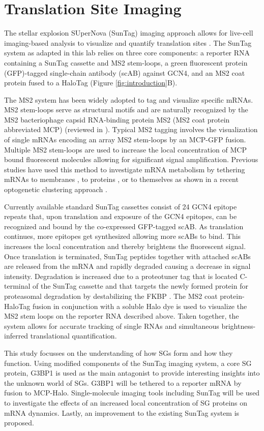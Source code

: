     
\section{Translation Site Imaging} \label{translation_site_imaging}

The stellar explosion SUperNova (SunTag) imaging approach allows for live-cell imaging-based analysis to visualize and quantify translation sites \cite{tanenbaum_protein-tagging_2014}.
The SunTag system as adapted in this lab relies on three core components: a reporter RNA containing a SunTag cassette and MS2 stem-loops, a green fluorescent protein (GFP)-tagged single-chain antibody (scAB) against GCN4, and an MS2 coat protein fused to a HaloTag (Figure \ref{fig:introduction}B).

The MS2 system has been widely adopted to tag and visualize specific mRNAs.
MS2 stem-loops serve as structural motifs and are naturally recognized by the MS2 bacteriophage capsid RNA-binding protein MS2 (MS2 coat protein abbreviated MCP) (reviewed in \cite{george_intracellular_2018}).
Typical MS2 tagging involves the visualization of single mRNAs encoding an array MS2 stem-loops by an MCP-GFP fusion.
Multiple MS2 stem-loops are used to increase the local concentration of MCP bound fluorescent molecules allowing for significant signal amplification.
Previous studies have used this method to investigate mRNA metabolism by tethering mRNAs to membranes \cite{genz_association_2013}, to proteins \cite{bos_tethered_2016}, or to themselves as shown in a recent optogenetic clustering approach \cite{kim_optogenetic_2020}.

Currently available standard SunTag cassettes consist of 24 GCN4 epitope repeats that, upon translation and exposure of the GCN4 epitopes, can be recognized and bound by the co-expressed GFP-tagged scAB.
As translation continues, more epitopes get synthesized allowing more scABs to bind.
This increases the local concentration and thereby brightens the fluorescent signal.
Once translation is terminated, SunTag peptides together with attached scABs are released from the mRNA and rapidly degraded causing a decrease in signal intensity.
Degradation is increased due to a proteotuner tag that is located C-terminal of the SunTag cassette and that targets the newly formed protein for proteasomal degradation by destabilizing the FKBP \cite{azevedo_systematic_2012}.
The MS2 coat protein-HaloTag fusion in conjunction with a soluble Halo dye is used to visualize the MS2 stem loops on the reporter RNA described above.
Taken together, the system allows for accurate tracking of single RNAs and simultaneous brightness-inferred translational quantification.

This study focusses on the understanding of how SGs form and how they function.
Using modified components of the SunTag imaging system, a core SG protein, G3BP1 is used as the main antagonist to provide interesting insights into the unknown world of SGs.
G3BP1 will be tethered to a reporter mRNA by fusion to MCP-Halo.
Single-molecule imaging tools including SunTag will be used to investigate the effects of an increased local concentration of SG proteins on mRNA dynamics.
Lastly, an improvement to the existing SunTag system is proposed.
